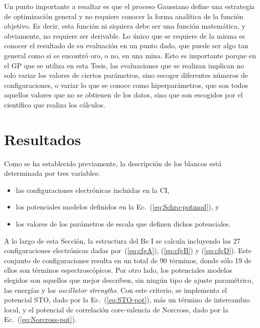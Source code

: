 Un punto importante a resaltar es que el proceso Gaussiano define una 
estrategia de optimización general y no requiere conocer la forma
analítica de la función objetivo. Es decir, esta función ni siquiera 
debe ser una función matemática, y obviamente, no 
requiere ser derivable. Lo único que se requiere de la misma es conocer 
el resultado de su evaluación en un punto dado, que puede ser algo tan 
general como si se encontró oro, o no, en una mina. Esto es importante 
porque en el GP que se utiliza en esta Tesis, las evaluaciones que se 
realizan implican no solo variar los valores de ciertos parámetros, 
sino escoger diferentes números de configuraciones, o variar lo que se 
conoce como hiperparámetros, que son todos aquellos valores que no se 
obtienen de los datos, sino que son escogidos por el científico que 
realiza los cálculos.

\section{Resultados}
\label{sec:results-rmatrix}

Como se ha establecido previamente, la descripción de los blancos está 
determinada por tres variables:
\begin{itemize}
\item las configuraciones electrónicas incluidas en la CI,
\item los potenciales modelos definidos en la 
Ec.~(\ref{eq:Schro-potmod}), y 
\item los valores de los parámetros de escala que definen dichos 
potenciales.
\end{itemize}
A lo largo de esta Sección, la estructura del Be I se calcula incluyendo
las 27 configuraciones electrónicas dadas por~(\ref{eq:cfgA}), 
(\ref{eq:cfgB}) y (\ref{eq:cfgD}). Este conjunto de configuraciones 
resulta en un total de 90 términos, donde sólo 19 de ellos son términos 
espectroscópicos. Por otro lado, los potenciales modelos elegidos son 
aquellos que mejor describen, sin ningún tipo de ajuste paramétrico, las 
energías y los \textit{oscillator strengths}. Con este criterio, se 
implementa el potencial STO, dado por la Ec.~(\ref{eq:STO-pot}), más un 
término de intercambio local, y el potencial de correlación 
core-valencia de Norcross, dado por la Ec.~(\ref{eq:Norcross-pot}).

